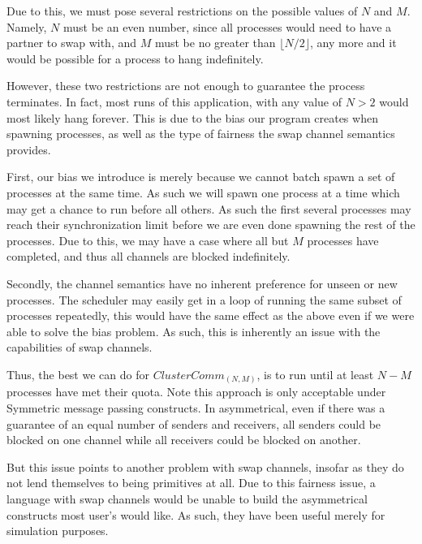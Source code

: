 Due to this, we must pose several restrictions on the possible values of $N$ and
$M$. Namely, $N$ must be an even number, since all processes would need to have a 
partner to swap with, and $M$ must be no greater than $\lfloor N/2 \rfloor$, any
more and it would be possible for a process to hang indefinitely.

However, these two restrictions are not enough to guarantee the process terminates.
In fact, most runs of this application, with any value of $N > 2$ would most 
likely hang forever. This is due to the bias our program creates when spawning
processes, as well as the type of fairness the swap channel semantics provides.

First, our bias we introduce is merely because we cannot batch spawn a set of
processes at the same time. As such we will spawn one process at a time which
may get a chance to run before all others. As such the first several processes
may reach their synchronization limit before we are even done spawning the rest
of the processes. Due to this, we may have a case where all but $M$ processes
have completed, and thus all channels are blocked indefinitely.

Secondly, the channel semantics have no inherent preference for unseen 
or new processes. The scheduler may easily get in a loop of running the same
subset of processes repeatedly, this would have the same effect as the above
even if we were able to solve the bias problem. As such, this is inherently an
issue with the capabilities of swap channels. 

Thus, the best we can do for $ClusterComm_{(N,M)}$, is to run until at least 
$N-M$ processes have met their quota. Note this approach is only acceptable 
under Symmetric message passing constructs. In asymmetrical, even if there was
a guarantee of an equal number of senders and receivers, all senders could be
blocked on one channel while all receivers could be blocked on another. 

But this issue points to another problem with swap channels, insofar as they do
not lend themselves to being primitives at all. Due to this fairness issue, a 
language with swap channels would be unable to build the asymmetrical constructs
most user's would like. As such, they have been useful merely for simulation 
purposes.

